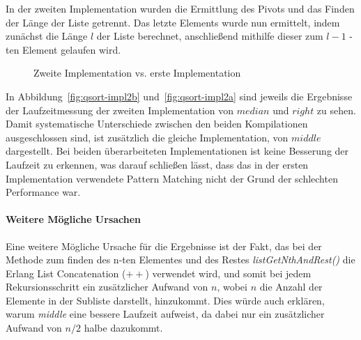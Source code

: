 In der zweiten Implementation wurden die Ermittlung des Pivots und das Finden
der Länge der Liste getrennt.
Das letzte Elements wurde nun ermittelt, indem zunächst
die Länge \(l\) der Liste berechnet, anschließend mithilfe dieser zum
\(l-1\) -ten Element gelaufen wird.
\begin{figure}[hbt]
    \centering
    \caption{Zweite Implementation vs. erste Implementation}
    \hfill
\end{figure}


In Abbildung~\ref{fig:qsort-impl2b} und~\ref{fig:qsort-impl2a} sind jeweils die
Ergebnisse der Laufzeitmessung der zweiten Implementation von \(median\) und
\(right\) zu sehen.
Damit systematische Unterschiede zwischen den beiden Kompilationen
ausgeschlossen sind, ist zusätzlich die gleiche Implementation, von \(middle\)
dargestellt.
Bei beiden überarbeiteten Implementationen ist keine Besserung der Laufzeit zu
erkennen, was darauf schließen lässt, dass das in der ersten Implementation
verwendete Pattern Matching nicht der Grund der schlechten Performance war.

\paragraph{Weitere Mögliche Ursachen}
Eine weitere Mögliche Ursache für die Ergebnisse ist der Fakt, das bei der
Methode zum finden des n-ten Elementes und des Restes
\textit{listGetNthAndRest()} die Erlang List Concatenation (\(++\)) verwendet
wird, und somit bei jedem Rekursionsschritt ein zusätzlicher Aufwand von
\(n\), wobei \(n\) die Anzahl der Elemente in der Subliste darstellt,
hinzukommt.
Dies würde auch erklären, warum \textit{middle} eine bessere Laufzeit
aufweist, da dabei nur ein zusätzlicher Aufwand von \(n/2\) halbe dazukommt.

